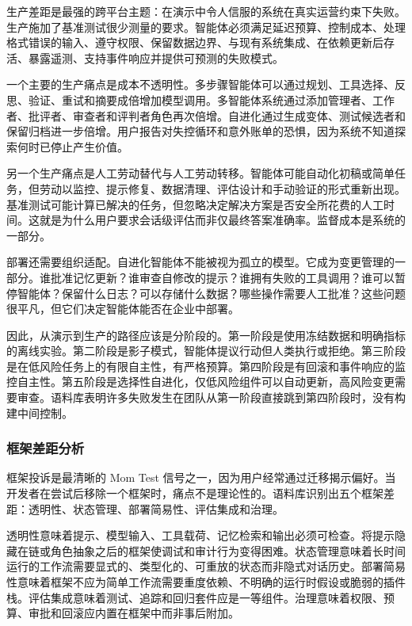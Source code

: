 生产差距是最强的跨平台主题：在演示中令人信服的系统在真实运营约束下失败。生产施加了基准测试很少测量的要求。智能体必须满足延迟预算、控制成本、处理格式错误的输入、遵守权限、保留数据边界、与现有系统集成、在依赖更新后存活、暴露遥测、支持事件响应并提供可预测的失败模式。

一个主要的生产痛点是成本不透明性。多步骤智能体可以通过规划、工具选择、反思、验证、重试和摘要成倍增加模型调用。多智能体系统通过添加管理者、工作者、批评者、审查者和评判者角色再次倍增。自进化通过生成变体、测试候选者和保留归档进一步倍增。用户报告对失控循环和意外账单的恐惧，因为系统不知道探索何时已停止产生价值。

另一个生产痛点是人工劳动替代与人工劳动转移。智能体可能自动化初稿或简单任务，但劳动以监控、提示修复、数据清理、评估设计和手动验证的形式重新出现。基准测试可能计算已解决的任务，但忽略决定解决方案是否安全所花费的人工时间。这就是为什么用户要求会话级评估而非仅最终答案准确率。监督成本是系统的一部分。

部署还需要组织适配。自进化智能体不能被视为孤立的模型。它成为变更管理的一部分。谁批准记忆更新？谁审查自修改的提示？谁拥有失败的工具调用？谁可以暂停智能体？保留什么日志？可以存储什么数据？哪些操作需要人工批准？这些问题很平凡，但它们决定智能体能否在企业中部署。

因此，从演示到生产的路径应该是分阶段的。第一阶段是使用冻结数据和明确指标的离线实验。第二阶段是影子模式，智能体提议行动但人类执行或拒绝。第三阶段是在低风险任务上的有限自主性，有严格预算。第四阶段是有回滚和事件响应的监控自主性。第五阶段是选择性自进化，仅低风险组件可以自动更新，高风险变更需要审查。语料库表明许多失败发生在团队从第一阶段直接跳到第四阶段时，没有构建中间控制。

\subsubsection{框架差距分析}
\label{sec:ch7-framework-gap-english}

框架投诉是最清晰的 Mom Test 信号之一，因为用户经常通过迁移揭示偏好。当开发者在尝试后移除一个框架时，痛点不是理论性的。语料库识别出五个框架差距：透明性、状态管理、部署简易性、评估集成和治理。

透明性意味着提示、模型输入、工具载荷、记忆检索和输出必须可检查。将提示隐藏在链或角色抽象之后的框架使调试和审计行为变得困难。状态管理意味着长时间运行的工作流需要显式的、类型化的、可重放的状态而非隐式对话历史。部署简易性意味着框架不应为简单工作流需要重度依赖、不明确的运行时假设或脆弱的插件栈。评估集成意味着测试、追踪和回归套件应是一等组件。治理意味着权限、预算、审批和回滚应内置在框架中而非事后附加。

